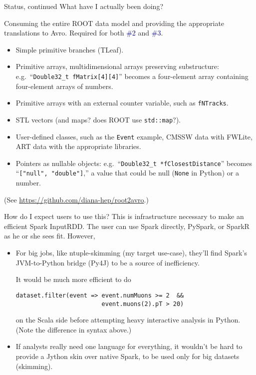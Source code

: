 \documentclass{beamer}
\begin{document}
\begin{frame}{Status, continued}
What have I actually been doing?

\vspace{0.2 cm}
Consuming the entire ROOT data model and providing the appropriate translations to Avro. Required for both \textcolor{darkblue}{\#2} and \textcolor{darkblue}{\#3}.

\begin{itemize}
\item Simple primitive branches (TLeaf).
\item Primitive arrays, multidimensional arrays preserving substructure: e.g.\ ``{\tt Double32\_t fMatrix[4][4]}'' becomes a four-element array containing four-element arrays of numbers.
\item Primitive arrays with an external counter variable, such as {\tt fNTracks}.
\item STL vectors (and maps? does ROOT use {\tt std::map}?).
\item User-defined classes, such as the {\tt Event} example, CMSSW data with FWLite, ART data with the appropriate libraries.
\item Pointers as nullable objects: e.g.\ ``{\tt Double32\_t *fClosestDistance}'' becomes ``{\tt ["null", "double"]},'' a value that could be null ({\tt None} in Python) or a number.
\end{itemize}

\vspace{0.2 cm}
(See \url{https://github.com/diana-hep/root2avro}.)
\end{frame}

\begin{frame}[fragile]{How do I expect users to use this?}
This is infrastructure necessary to make an efficient Spark InputRDD. The user can use Spark directly, PySpark, or SparkR as he or she sees fit. However,

\begin{itemize}
\item For big jobs, like ntuple-skimming (my target use-case), they'll find Spark's JVM-to-Python bridge (Py4J) to be a source of inefficiency.

\vspace{0.2 cm}
It would be much more efficient to do
\begin{verbatim}
dataset.filter(event => event.numMuons >= 2  &&
                        event.muons(2).pT > 20)
\end{verbatim}
on the Scala side before attempting heavy interactive analysis in Python. (Note the difference in syntax above.)

\item If analysts really need one language for everything, it wouldn't be hard to provide a Jython skin over native Spark, to be used only for big datasets (skimming).
\end{itemize}
\end{frame}
\end{document}
